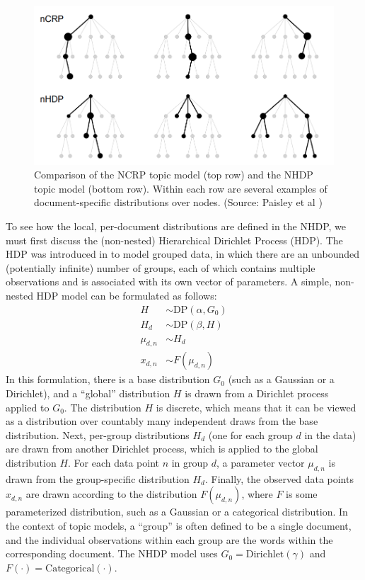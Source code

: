 \documentclass{article}
\begin{document}
\begin{figure}
\centering
\includegraphics[width=0.8\linewidth]{../figures/ncrp_vs_nhdp.png}
\caption{Comparison of the NCRP topic model (top row) and the NHDP topic model (bottom row).  %
Within each row are several examples of document-specific distributions over nodes.  %
(Source: Paisley et al \cite{paisley2015nhdp})}
\label{fig:ncrp-vs-nhdp}
\end{figure}


To see how the local, per-document distributions are defined in the NHDP, we must first discuss the (non-nested) Hierarchical Dirichlet Process (HDP).
The HDP was introduced in \cite{teh2005hdp} to model grouped data, in which there are an unbounded (potentially infinite) number of groups, each of which contains multiple observations and is associated with its own vector of parameters.
A simple, non-nested HDP model can be formulated as follows:
\begin{align}
H &\sim \text{DP}(\alpha, G_0) \\
H_d &\sim \text{DP}(\beta, H) \\
\mu_{d,n} &\sim H_d \\
x_{d,n} &\sim F(\mu_{d,n})
\end{align}
In this formulation, there is a base distribution $G_0$ (such as a Gaussian or a Dirichlet), and a ``global'' distribution $H$ is drawn from a Dirichlet process applied to $G_0$.
The distribution $H$ is discrete, which means that it can be viewed as a distribution over countably many independent draws from the base distribution.
Next, per-group distributions $H_d$ (one for each group $d$ in the data) are drawn from another Dirichlet process, which is applied to the global distribution $H$.
For each data point $n$ in group $d$, a parameter vector $\mu_{d,n}$ is drawn from the group-specific distribution $H_d$.
Finally, the observed data points $x_{d,n}$ are drawn according to the distribution $F(\mu_{d,n})$, where $F$ is some parameterized distribution, such as a Gaussian or a categorical distribution.
In the context of topic models, a ``group'' is often defined to be a single document, and the individual observations within each group are the words within the corresponding document.
The NHDP model uses $G_0 = \text{Dirichlet}(\gamma)$ and $F(\cdot) = \text{Categorical}(\cdot)$.
\end{document}
